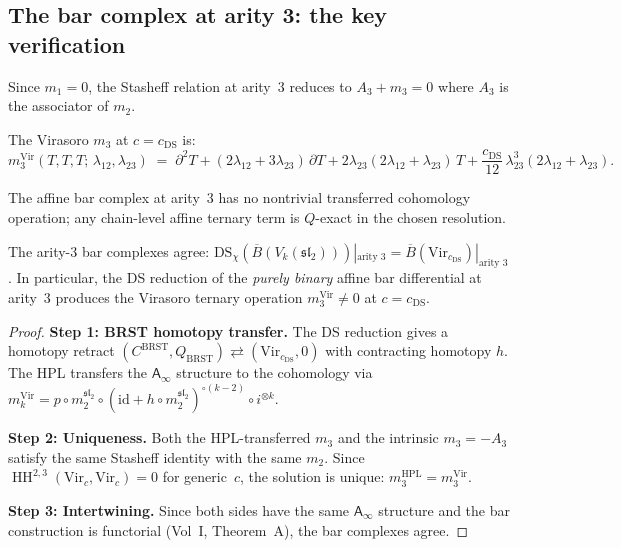 \documentclass[11pt]{article}
\newcommand{\fsl}{\mathfrak{sl}}
\newcommand{\barB}{\overline{B}}
\newcommand{\Ainf}{\mathsf{A}_{\infty}}
\newcommand{\id}{\mathrm{id}}
\newcommand{\HH}{\operatorname{HH}}
\begin{document}
\subsection{The bar complex at arity 3: the key verification}

Since $m_1 = 0$, the Stasheff relation at arity~$3$ reduces to
$A_3 + m_3 = 0$ where $A_3$ is the associator of $m_2$.

The Virasoro $m_3$ at $c = c_{\mathrm{DS}}$ is:
\begin{equation}\label{eq:wn-vir-m3-ds}
\boxed{
m_3^{\mathrm{Vir}}(T,T,T;\,\lambda_{12},\lambda_{23})
\;=\;
\partial^2 T + (2\lambda_{12} + 3\lambda_{23})\,\partial T
+ 2\lambda_{23}(2\lambda_{12} + \lambda_{23})\,T
+ \frac{c_{\mathrm{DS}}}{12}\,
\lambda_{23}^3(2\lambda_{12} + \lambda_{23}).}
\end{equation}

The affine bar complex at arity~$3$ has no nontrivial transferred
cohomology operation; any chain-level affine ternary term is
$Q$-exact in the chosen resolution.

\begin{theorem}%
\label{thm:wn-ds-bar-arity-3}
The arity-$3$ bar complexes agree:
$\mathrm{DS}_\chi(\barB(V_k(\fsl_2)))|_{\text{arity }3}
= \barB(\mathrm{Vir}_{c_{\mathrm{DS}}})|_{\text{arity }3}$.
In particular, the DS reduction of the \emph{purely
binary} affine bar differential at arity~$3$ produces the
Virasoro ternary operation $m_3^{\mathrm{Vir}} \ne 0$
at $c = c_{\mathrm{DS}}$.
\end{theorem}

\begin{proof}
\textbf{Step 1: BRST homotopy transfer.}
The DS reduction gives a homotopy retract
$(C^{\mathrm{BRST}}, Q_{\mathrm{BRST}})
\rightleftarrows (\mathrm{Vir}_{c_{\mathrm{DS}}}, 0)$
with contracting homotopy $h$.  The HPL transfers the
$\Ainf$ structure to the cohomology via
$m_k^{\mathrm{Vir}} = p \circ m_2^{\fsl_2}
\circ (\id + h \circ m_2^{\fsl_2})^{\circ(k-2)}
\circ i^{\otimes k}$.

\medskip
\noindent\textbf{Step 2: Uniqueness.}
Both the HPL-transferred $m_3$ and the intrinsic $m_3 = -A_3$
satisfy the same Stasheff identity with the same $m_2$.
Since $\HH^{2,3}(\mathrm{Vir}_c, \mathrm{Vir}_c) = 0$ for
generic~$c$, the solution is unique:
$m_3^{\mathrm{HPL}} = m_3^{\mathrm{Vir}}$.

\medskip
\noindent\textbf{Step 3: Intertwining.}
Since both sides have the same $\Ainf$ structure and the bar
construction is functorial (Vol~I, Theorem~A), the bar complexes agree.
\end{proof}
\end{document}
